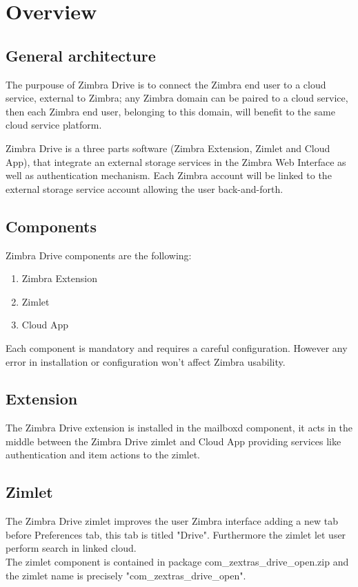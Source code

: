 \section{Overview}
\subsection{General architecture}\label{subsec:general architecture}
    The purpouse of Zimbra Drive is to connect the Zimbra end user to a cloud service, external to Zimbra;
    any Zimbra domain can be paired to a cloud service, then each Zimbra end user, belonging to this domain,
    will benefit to the same cloud service platform.

    Zimbra Drive is a three parts software (Zimbra Extension, Zimlet and Cloud App),
    that integrate an external storage services in the Zimbra Web Interface as well as authentication mechanism.
    Each Zimbra account will be linked to the external storage service account allowing the user back-and-forth.
%

\subsection{Components}
    Zimbra Drive components are the following:
    \begin{enumerate}
        \item Zimbra Extension
        \item Zimlet
        \item Cloud App
    \end{enumerate}
    \begin{warning}
        Each component is mandatory and requires a careful configuration.
        However any error in installation or configuration won't affect Zimbra usability.
    \end{warning}

        \subsection{Extension}
        The Zimbra Drive extension is installed in the mailboxd component, it acts in the middle between the Zimbra
        Drive zimlet and Cloud App providing services like authentication and item actions to the zimlet.

        \subsection{Zimlet}
        The Zimbra Drive zimlet improves the user Zimbra interface adding a new tab before Preferences tab,
        this tab is titled "Drive". Furthermore the zimlet let user perform search in linked cloud.\\
        The zimlet component is contained in package com\_zextras\_drive\_open.zip and the zimlet name is precisely
        "com\_zextras\_drive\_open".


